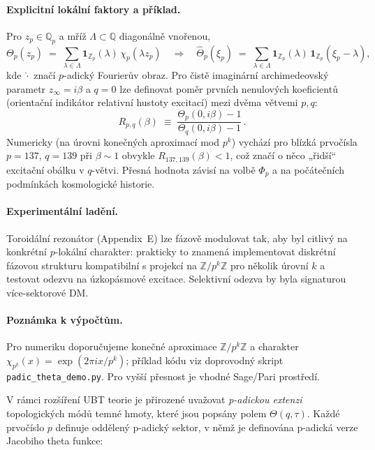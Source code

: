\paragraph{Explicitní lokální faktory a příklad.}
Pro $z_p\!\in\!\mathbb{Q}_p$ a mříž $\Lambda\!\subset\!\mathbb{Q}$ diagonálně vnořenou,
\begin{equation}
\Theta_p(z_p) \;=\; \sum_{\lambda\in\Lambda} \mathbf{1}_{\mathbb{Z}_p}(\lambda)\,\chi_p(\lambda z_p)
\quad\Rightarrow\quad
\widehat{\Theta}_p(\xi_p) \;=\; \sum_{\lambda\in\Lambda} \mathbf{1}_{\mathbb{Z}_p}(\lambda)\,\mathbf{1}_{\mathbb{Z}_p}(\xi_p-\lambda),
\end{equation}
kde $\widehat{\cdot}$ značí $p$-adický Fourierův obraz. Pro čistě imaginární archimedeovský parametr $z_\infty=i\beta$ a $q=0$ lze definovat
poměr prvních nenulových koeficientů (orientační indikátor relativní hustoty excitací) mezi dvěma větvemi $p,q$:
\begin{equation}
R_{p,q}(\beta) \;\equiv\; \frac{\Theta_p(0,i\beta)-1}{\Theta_q(0,i\beta)-1}\,.
\end{equation}
Numericky (na úrovni konečných aproximací mod $p^k$) vychází pro blízká prvočísla $p=137$, $q=139$ při $\beta\!\sim\!1$ obvykle $R_{137,139}(\beta)<1$,
což značí o něco „řidší“ excitační obálku v $q$-větvi. Přesná hodnota závisí na volbě $\Phi_p$ a na počátečních podmínkách kosmologické historie.

\paragraph{Experimentální ladění.}
Toroidální rezonátor (Appendix~E) lze fázově modulovat tak, aby byl citlivý na konkrétní $p$-lokální charakter: prakticky to znamená implementovat
diskrétní fázovou strukturu kompatibilní s projekcí na $\mathbb{Z}/p^k\mathbb{Z}$ pro několik úrovní $k$ a testovat odezvu na úzkopásmové excitace.
Selektivní odezva by byla signaturou více-sektorové DM.

\paragraph{Poznámka k výpočtům.}
Pro numeriku doporučujeme konečné aproximace $\mathbb{Z}/p^k\mathbb{Z}$ a charakter $\chi_{p^k}(x)=\exp(2\pi i x/p^k)$; příklad kódu viz doprovodný skript
\texttt{padic\_theta\_demo.py}. Pro vyšší přesnost je vhodné Sage/Pari prostředí.






V rámci rozšíření UBT teorie je přirozené uvažovat \emph{p-adickou extenzi} topologických módů
temné hmoty, které jsou popsány polem $\Theta(q,\tau)$. Každé prvočíslo $p$ definuje oddělený
p-adický sektor, v němž je definována p-adická verze Jacobiho theta funkce:

